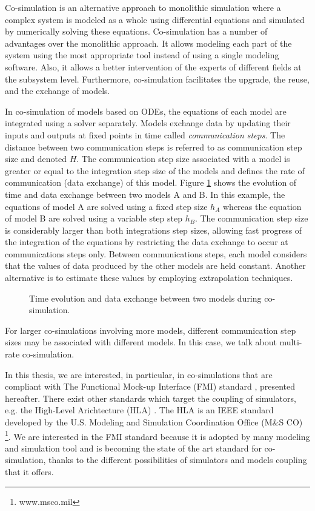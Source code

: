Co-simulation is an alternative approach to monolithic simulation where a complex system is modeled as a whole using differential equations and simulated by numerically solving these equations. Co-simulation has a number of advantages over the monolithic approach. It allows modeling each part of the system using the most appropriate tool instead of using a single modeling software. Also, it allows a better intervention of the experts of different fields at the subsystem level. Furthermore, co-simulation facilitates the upgrade, the reuse, and the exchange of models. 

In co-simulation of models based on ODEs, the equations of each model are integrated using a solver separately. Models exchange data by updating their inputs and outputs at fixed points in time called \textit{communication steps}. The distance between two communication steps is referred to as communication step size and denoted $H$. The communication step size associated with a model is greater or equal to the integration step size of the models and defines the rate of communication (data exchange) of this model. Figure \ref{fig:cosim} shows the evolution of time and data exchange between two models A and B. In this example, the equations of model A are solved using a fixed step size $h_A$ whereas the equation of model B are solved using a variable step step $h_B$. The communication step size is considerably larger than both integrations step sizes, allowing fast progress of the integration of the equations by restricting the data exchange to occur at communications steps only. Between communications steps, each model considers that the values of data produced by the other models are held constant. Another alternative is to estimate these values by employing extrapolation techniques.

\begin{figure}[phbt]
\centering

\caption{Time evolution and data exchange between two models during co-simulation.}
\label{fig:cosim}
\end{figure}

For larger co-simulations involving more models, different communication step sizes may be associated with different models. In this case, we talk about multi-rate co-simulation.

In this thesis, we are interested, in particular, in co-simulations that are compliant with The Functional Mock-up Interface (FMI) standard \cite{fmi:2014}, presented hereafter. There exist other standards which target the coupling of simulators, e.g. the High-Level Arichtecture (HLA) \cite{ieee1516:2012}. The HLA is an IEEE standard developed by the U.S. Modeling and Simulation Coordination Office (M\&S CO) \footnote{www.msco.mil}. We are interested in the FMI standard because it is adopted by many modeling and simulation tool and is becoming the state of the art standard for co-simulation, thanks to the different possibilities of simulators and models coupling that it offers.


